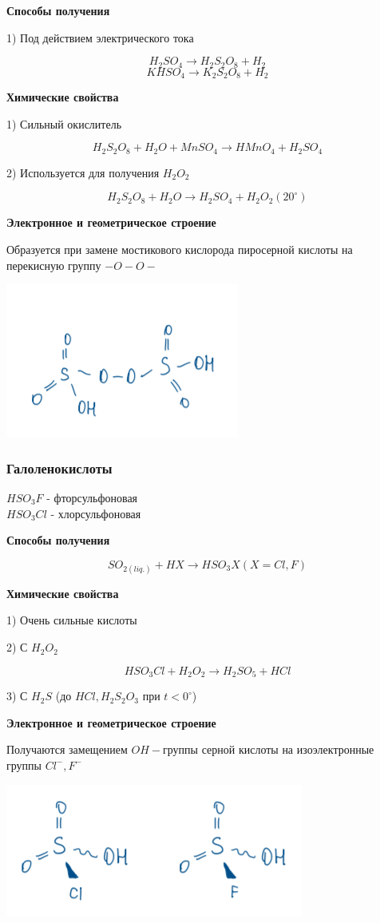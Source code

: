 \textbf{Способы получения}

1) Под действием электрического тока

$$H_2SO_4 \rightarrow H_2S_2O_8 + H_2$$
$$KHSO_4 \rightarrow K_2S_2O_8 + H_2$$

\textbf{Химические свойства}

1) Сильный окислитель

$$H_2S_2O_8 + H_2O + MnSO_4 \rightarrow HMnO_4 + H_2SO_4$$

2) Используется для получения $H_2O_2$

$$H_2S_2O_8 + H_2O \rightarrow H_2SO_4 + H_2O_2 (20^{\circ})$$

\textbf{Электронное и геометрическое строение}

Образуется при замене мостикового кислорода пиросерной кислоты на перекисную группу $-O-O-$

\includegraphics{images/7v10.png}

\subsubsection*{Галоленокислоты}

$HSO_3F$ - фторсульфоновая\\
$HSO_3Cl$ - хлорсульфоновая

\textbf{Способы получения}

$$SO_{2(liq.)} + HX \rightarrow HSO_3X(X=Cl,F)$$

\textbf{Химические свойства}

1) Очень сильные кислоты

2) С $H_2O_2$

$$HSO_3Cl + H_2O_2 \rightarrow H_2SO_5 + HCl$$

3) С $H_2S$ (до $HCl, H_2S_2O_3$ при $t<0^{\circ}$) 


\textbf{Электронное и геометрическое строение}

Получаются замещением $OH-$группы серной кислоты на изоэлектронные группы $Cl^-, F^-$

\includegraphics{images/7v11.png}
